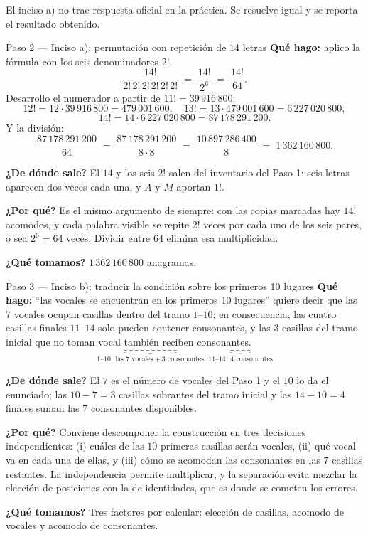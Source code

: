 \documentclass[11pt]{article}
\begin{document}
\begin{nota}
El inciso a) no trae respuesta oficial en la práctica. Se resuelve igual y se reporta el resultado obtenido.
\end{nota}

\begin{paso}{Paso 2 --- Inciso a): permutación con repetición de 14 letras}
\textbf{Qué hago:} aplico la fórmula con los seis denominadores $2!$.
\[
\frac{14!}{2!\,2!\,2!\,2!\,2!\,2!} \;=\; \frac{14!}{2^{6}} \;=\; \frac{14!}{64}.
\]
Desarrollo el numerador a partir de $11!=39\,916\,800$:
\[
12! = 12\cdot 39\,916\,800 = 479\,001\,600,\quad
13! = 13\cdot 479\,001\,600 = 6\,227\,020\,800,
\]
\[
14! = 14\cdot 6\,227\,020\,800 = 87\,178\,291\,200 .
\]
Y la división:
\[
\frac{87\,178\,291\,200}{64} \;=\; \frac{87\,178\,291\,200}{8\cdot 8}
\;=\; \frac{10\,897\,286\,400}{8} \;=\; 1\,362\,160\,800 .
\]

\textbf{¿De dónde sale?} El $14$ y los seis $2!$ salen del inventario del Paso 1: seis letras aparecen dos
veces cada una, y $A$ y $M$ aportan $1!$.

\textbf{¿Por qué?} Es el mismo argumento de siempre: con las copias marcadas hay $14!$ acomodos, y cada
palabra visible se repite $2!$ veces por cada uno de los seis pares, o sea $2^6=64$ veces. Dividir entre $64$
elimina esa multiplicidad.

\textbf{¿Qué tomamos?} $1\,362\,160\,800$ anagramas.
\end{paso}

\begin{paso}{Paso 3 --- Inciso b): traducir la condición sobre los primeros 10 lugares}
\textbf{Qué hago:} ``las vocales se encuentran en los primeros 10 lugares'' quiere decir que las $7$ vocales
ocupan casillas dentro del tramo $1$--$10$; en consecuencia, las cuatro casillas finales $11$--$14$ solo
pueden contener consonantes, y las $3$ casillas del tramo inicial que no toman vocal también reciben
consonantes.
\[
\underbrace{\_\ \_\ \_\ \_\ \_\ \_\ \_\ \_\ \_\ \_}_{1\text{--}10:\ \text{las }7\text{ vocales} + 3\text{ consonantes}}\ \
\underbrace{\_\ \_\ \_\ \_}_{11\text{--}14:\ 4\text{ consonantes}}
\]

\textbf{¿De dónde sale?} El $7$ es el número de vocales del Paso 1 y el $10$ lo da el enunciado; las
$10-7=3$ casillas sobrantes del tramo inicial y las $14-10=4$ finales suman las $7$ consonantes disponibles.

\textbf{¿Por qué?} Conviene descomponer la construcción en tres decisiones independientes: (i) cuáles de las
$10$ primeras casillas serán vocales, (ii) qué vocal va en cada una de ellas, y (iii) cómo se acomodan las
consonantes en las $7$ casillas restantes. La independencia permite multiplicar, y la separación evita
mezclar la elección de posiciones con la de identidades, que es donde se cometen los errores.

\textbf{¿Qué tomamos?} Tres factores por calcular: elección de casillas, acomodo de vocales y acomodo de
consonantes.
\end{paso}
\end{document}
